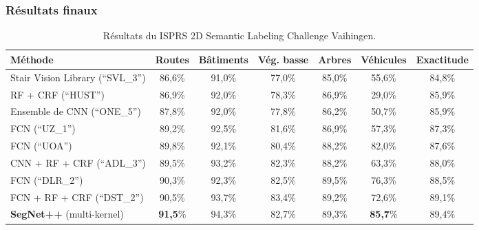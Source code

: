 \subsubsection{Résultats finaux}

\begin{table}[t]
  \centering
  \caption{Résultats du \gls{ISPRS} 2D Semantic Labeling Challenge Vaihingen.}
  \begin{tabularx}{\textwidth}{ Y c c c c c c }
  \toprule
  Méthode & Routes & Bâtiments & Vég. basse & Arbres & Véhicules & Exactitude\\
  \midrule
  Stair Vision Library {\scriptsize (``SVL\_3'')}\cite{gerke_use_2015} & 86,6\% &	91,0\% &	77,0\% &	85,0\%	& 55,6\% &	84,8\% \\
  RF + CRF {\scriptsize (``HUST'')}\cite{quang_efficient_2015} & 86,9\% & 92,0\% &	78,3\% &	86,9\% &	29,0\% &	85,9\% \\
  Ensemble de CNN {\scriptsize (``ONE\_5'')}\cite{boulch_dag_2015} & 87,8\% &	92,0\% &	77,8\% &	86,2\% &	50,7\% &	85,9\% \\
  FCN {\scriptsize (``UZ\_1'')}\cite{volpi_dense_2017} & 89,2\% &	92,5\% &	81,6\% &	86,9\% &	57,3\% &	87,3\% \\
  FCN {\scriptsize (``UOA'')}\cite{lin_efficient_2015} & 89,8\% &	92,1\% &	80,4\% &	88,2\% &	82,0\% &	87,6\% \\
  CNN + RF + CRF {\scriptsize (``ADL\_3'')}\cite{paisitkriangkrai_effective_2015} & 89,5\% &	93,2\% &	82,3\% &	88,2\% &	63,3\% &	88,0\% \\
  FCN {\scriptsize (``DLR\_2'')}\cite{marmanis_semantic_2016} & 90,3\% &	92,3\% &	82,5\% &	89,5\% &	76,3\% &	88,5\% \\
  FCN + RF + CRF {\scriptsize (``DST\_2'')}\cite{sherrah_fully_2016} & 90,5\% &	93,7\% &	83,4\% &	89,2\% &	72,6\% &	89,1\% \\
  \midrule
  \textbf{SegNet++} (multi-kernel)\cite{audebert_semantic_2016} & \textbf{91,5}\% &	94,3\% &	82,7\% &	89,3\% &	\textbf{85,7}\% &	89,4\% \\
  \bottomrule
  \end{tabularx}
  \label{tab:final_vaihingen}
\end{table}

